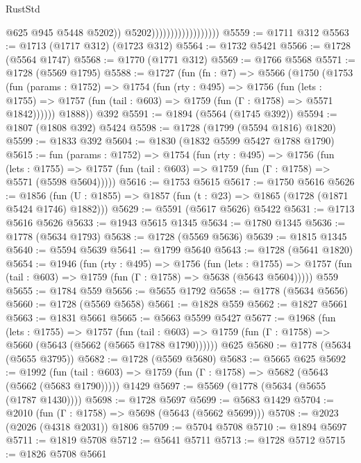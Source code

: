 \begin{lexlean}{RustStd}
\begin{coremodule}
                                            @625
                                            @945
                                            @5448
                                            @5202))
                                        @5202))))))))))))))))))
@5559 := @1711 @312
@5563 := @1713 (@1717 @312) (@1723 @312)
@5564 := @1732 @5421
@5566 := @1728 (@5564 @1747)
@5568 := @1770 (@1771 @312)
@5569 := @1766 @5568
@5571 := @1728 (@5569 @1795)
@5588 := @1727
    (fun (fn : @7) =>
    @5566
      (@1750
        (@1753
          (fun (params : @1752) =>
          @1754
            (fun (rty : @495) =>
            @1756
              (fun (lets : @1755) =>
              @1757 (fun (tail : @603) => @1759 (fun (Γ : @1758) => @5571 @1842))))))
        @1888))
    @392
@5591 := @1894 (@5564 (@1745 @392))
@5594 := @1807 (@1808 @392) @5424
@5598 := @1728 (@1799 (@5594 @1816) @1820)
@5599 := @1833 @392
@5604 := @1830 (@1832 @5599 @5427 @1788 @1790)
@5615 := fun (params : @1752) =>
  @1754
    (fun (rty : @495) =>
    @1756
      (fun (lets : @1755) =>
      @1757 (fun (tail : @603) => @1759 (fun (Γ : @1758) => @5571 (@5598 @5604)))))
@5616 := @1753 @5615
@5617 := @1750 @5616
@5626 := @1856 (fun (U : @1855) => @1857 (fun (t : @23) => @1865 (@1728 (@1871 @5424 @1746) @1882)))
@5629 := @5591 (@5617 @5626) @5422
@5631 := @1713 @5616 @5626
@5633 := @1943 @5615 @1345
@5634 := @1780 @1345
@5636 := @1778 (@5634 @1793)
@5638 := @1728 (@5569 @5636)
@5639 := @1815 @1345
@5640 := @5594 @5639
@5641 := @1799 @5640
@5643 := @1728 (@5641 @1820)
@5654 := @1946
    (fun (rty : @495) =>
    @1756
      (fun (lets : @1755) =>
      @1757 (fun (tail : @603) => @1759 (fun (Γ : @1758) => @5638 (@5643 @5604)))))
    @559
@5655 := @1784 @559
@5656 := @5655 @1792
@5658 := @1778 (@5634 @5656)
@5660 := @1728 (@5569 @5658)
@5661 := @1828 @559
@5662 := @1827 @5661
@5663 := @1831 @5661
@5665 := @5663 @5599 @5427
@5677 := @1968
    (fun (lets : @1755) =>
    @1757
      (fun (tail : @603) => @1759 (fun (Γ : @1758) => @5660 (@5643 (@5662 (@5665 @1788 @1790))))))
    @625
@5680 := @1778 (@5634 (@5655 @3795))
@5682 := @1728 (@5569 @5680)
@5683 := @5665 @625
@5692 := @1992
    (fun (tail : @603) => @1759 (fun (Γ : @1758) => @5682 (@5643 (@5662 (@5683 @1790)))))
    @1429
@5697 := @5569 (@1778 (@5634 (@5655 (@1787 @1430))))
@5698 := @1728 @5697
@5699 := @5683 @1429
@5704 := @2010 (fun (Γ : @1758) => @5698 (@5643 (@5662 @5699)))
@5708 := @2023 (@2026 (@4318 @2031)) @1806
@5709 := @5704 @5708
@5710 := @1894 @5697
@5711 := @1819 @5708
@5712 := @5641 @5711
@5713 := @1728 @5712
@5715 := @1826 @5708 @5661

\end{coremodule}
\end{lexlean}
